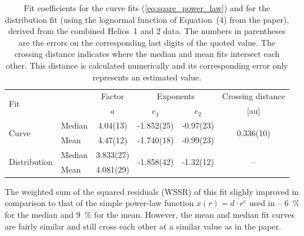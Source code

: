 \begin{table}
	\caption{Fit coefficients for the curve fits (\autoref{eq:sqare_power_law}) and for the distribution fit (using the lognormal function of Equation~(4) from the paper), derived from the combined Helios~1 and 2 data. The numbers in parentheses are the errors on the corresponding last digits of the quoted value. The crossing distance indicates where the median and mean fits intersect each other. This distance is calculated numerically and its corresponding error only represents an estimated value.}
	\label{tab:bfield_fit_parameters}
	\centering
	\begin{tabular}{l l c c c c}
		\hline\hline
		\multirow{2}{*}{Fit}	&	&Factor	&\multicolumn{2}{c}{Exponents}	&Crossing distance\\
		\cline{4-5}
			&	&$a$	&$e_1$	&$e_2$	&[au]\\
		\hline
		\multirow{2}{*}{Curve}	&Median	&4.04(13)	&-1.852(25)	&-0.97(23)	&\multirow{2}{*}{0.336(10)}\\
			&Mean	&4.47(12)	&-1.740(18)	&-0.99(23)	&\\
		\multirow{2}{*}{Distribution}	&Median	&3.833(27)	&\multirow{2}{*}{-1.858(42)}	&\multirow{2}{*}{-1.32(12)}	&\multirow{2}{*}{--}\\
			&Mean	&4.081(29)	&	&	&\\
		\hline
	\end{tabular}
\end{table}
%

The weighted sum of the squared residuals (WSSR) of this fit slighly improved in comparison to that of the simple power-law function $x(r) = d \cdot r^e$ used in \citet{Venzmer2018} -- \SI{6}{\%} for the median and \SI{9}{\%} for the mean. However, the mean and median fit curves are fairly similar and still cross each other at a similar value as in the paper.\\

